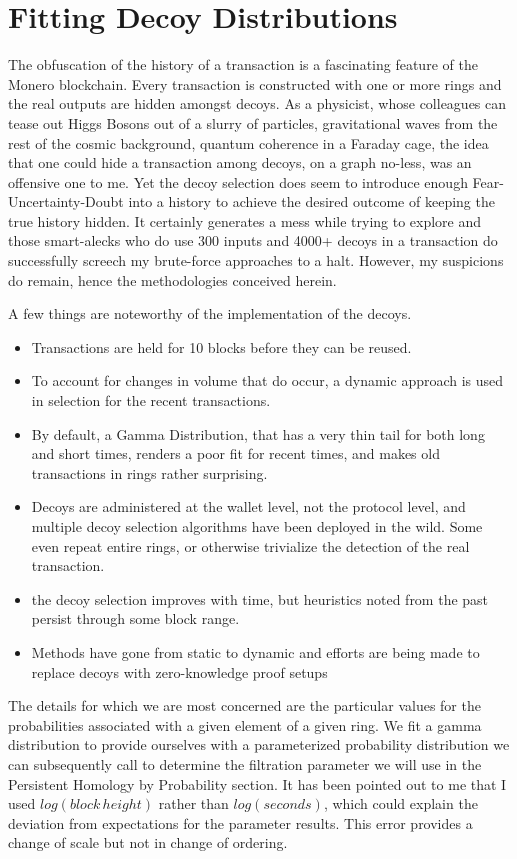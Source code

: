 \section{Fitting Decoy Distributions}

The obfuscation of the history of a transaction is a fascinating feature of the Monero blockchain.  
Every transaction is constructed with one or more rings and the real outputs are hidden amongst decoys.
As a physicist, whose colleagues can tease out Higgs Bosons out of a slurry of particles, gravitational waves from the rest of the cosmic background, quantum coherence in a Faraday cage, the idea that one could hide a transaction among decoys, on a graph no-less, was an offensive one to me.  
Yet the decoy selection does seem to introduce enough Fear-Uncertainty-Doubt into a history to achieve the desired outcome of keeping the true history hidden.
It certainly generates a mess while trying to explore and those smart-alecks who do use 300 inputs and 4000+ decoys in a transaction do successfully screech my brute-force approaches to a halt.
However, my suspicions do remain, hence the methodologies conceived herein.

A few things are noteworthy of the implementation of the decoys.  

\begin{itemize}
\item Transactions are held for 10 blocks before they can be reused.  
\item To account for changes in volume that do occur, a dynamic approach is used in selection for the recent transactions.
\item By default, a Gamma Distribution, that has a very thin tail for both long and short times, renders a poor fit for recent times, and makes old transactions in rings rather surprising.
\item Decoys are administered at the wallet level, not the protocol level, and multiple decoy selection algorithms have been deployed in the wild.  Some even repeat entire rings, or otherwise trivialize the detection of the real transaction.  
\item the decoy selection improves with time, but heuristics noted from the past persist through some block range.
\item Methods have gone from static to dynamic and efforts are being made to replace decoys with zero-knowledge proof setups
\end{itemize}

The details for which we are most concerned are the particular values for the probabilities associated with a given element of a given ring.  
We fit a gamma distribution to provide ourselves with a parameterized probability distribution we can subsequently call to determine the filtration parameter we will use in the Persistent Homology by Probability section.
It has been pointed out to me that I used $log(block\, height)$ rather than $log(seconds)$, which could explain the deviation from expectations for the parameter results.  
This error provides a change of scale but not in change of ordering.

